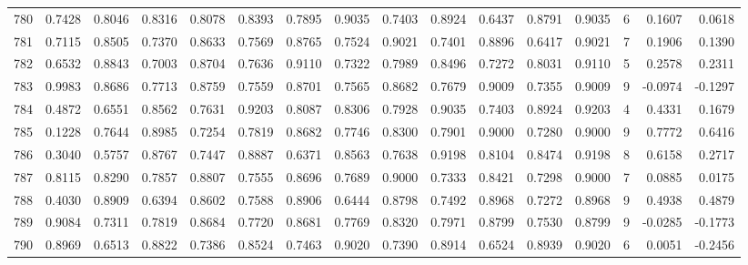\begin{tabular}{lrrrrrrrrrrrrrrr}
780 &      0.7428 &  0.8046 &  0.8316 &  0.8078 &  0.8393 &  0.7895 &  0.9035 &  0.7403 &  0.8924 &  0.6437 &   0.8791 &     0.9035 &      6 &                    0.1607 &                     0.0618 \\
781 &      0.7115 &  0.8505 &  0.7370 &  0.8633 &  0.7569 &  0.8765 &  0.7524 &  0.9021 &  0.7401 &  0.8896 &   0.6417 &     0.9021 &      7 &                    0.1906 &                     0.1390 \\
782 &      0.6532 &  0.8843 &  0.7003 &  0.8704 &  0.7636 &  0.9110 &  0.7322 &  0.7989 &  0.8496 &  0.7272 &   0.8031 &     0.9110 &      5 &                    0.2578 &                     0.2311 \\
783 &      0.9983 &  0.8686 &  0.7713 &  0.8759 &  0.7559 &  0.8701 &  0.7565 &  0.8682 &  0.7679 &  0.9009 &   0.7355 &     0.9009 &      9 &                   -0.0974 &                    -0.1297 \\
784 &      0.4872 &  0.6551 &  0.8562 &  0.7631 &  0.9203 &  0.8087 &  0.8306 &  0.7928 &  0.9035 &  0.7403 &   0.8924 &     0.9203 &      4 &                    0.4331 &                     0.1679 \\
785 &      0.1228 &  0.7644 &  0.8985 &  0.7254 &  0.7819 &  0.8682 &  0.7746 &  0.8300 &  0.7901 &  0.9000 &   0.7280 &     0.9000 &      9 &                    0.7772 &                     0.6416 \\
786 &      0.3040 &  0.5757 &  0.8767 &  0.7447 &  0.8887 &  0.6371 &  0.8563 &  0.7638 &  0.9198 &  0.8104 &   0.8474 &     0.9198 &      8 &                    0.6158 &                     0.2717 \\
787 &      0.8115 &  0.8290 &  0.7857 &  0.8807 &  0.7555 &  0.8696 &  0.7689 &  0.9000 &  0.7333 &  0.8421 &   0.7298 &     0.9000 &      7 &                    0.0885 &                     0.0175 \\
788 &      0.4030 &  0.8909 &  0.6394 &  0.8602 &  0.7588 &  0.8906 &  0.6444 &  0.8798 &  0.7492 &  0.8968 &   0.7272 &     0.8968 &      9 &                    0.4938 &                     0.4879 \\
789 &      0.9084 &  0.7311 &  0.7819 &  0.8684 &  0.7720 &  0.8681 &  0.7769 &  0.8320 &  0.7971 &  0.8799 &   0.7530 &     0.8799 &      9 &                   -0.0285 &                    -0.1773 \\
790 &      0.8969 &  0.6513 &  0.8822 &  0.7386 &  0.8524 &  0.7463 &  0.9020 &  0.7390 &  0.8914 &  0.6524 &   0.8939 &     0.9020 &      6 &                    0.0051 &                    -0.2456 \\

\end{tabular}

